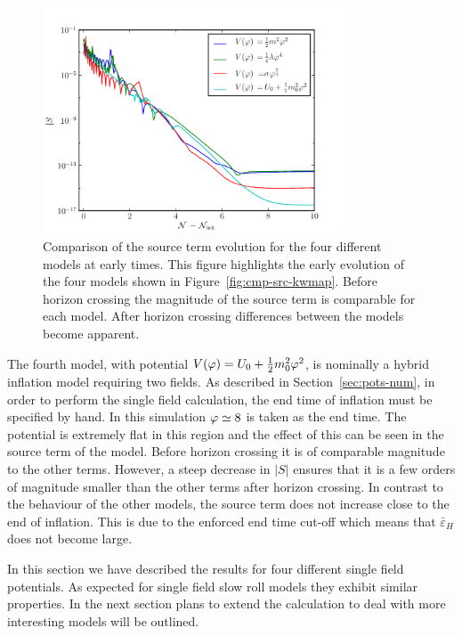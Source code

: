 \begin{figure}[htbp]
 \centering
 \includegraphics[width=0.8\textwidth]{numerical/graphs/cmp_src_kwmap_zoom-large}
 \caption[Comparison of Source Term at Early Times]{Comparison of the
source term evolution for the four different models at early times. This figure
highlights the early evolution of the four models shown in
Figure~\ref{fig:cmp-src-kwmap}. Before horizon crossing the magnitude of the source
term is comparable for each model. After horizon crossing differences between the
models become apparent.}
\label{fig:cmp-src-zoom-kwmap}
\end{figure}
% 

The fourth model, with potential $V(\varphi)=U_0 + \frac{1}{2} m_0^2 \varphi^2$, is nominally a hybrid
inflation model
requiring two fields.
As described in Section~\ref{sec:pots-num}, in order to perform the single field
calculation, the end time of inflation must be specified by hand. In this simulation
$\varphi\simeq 8$
is taken as the end time. The potential is extremely flat in this region and the
effect of this can
be seen in the source term of the model. Before horizon crossing it is of comparable magnitude to
the other terms. However, a steep decrease in $|S|$ ensures that it is a few orders
of magnitude
smaller than
the other terms after horizon crossing. In contrast to the behaviour of the other models, the source
term does not increase close to the end of inflation. This is due to the enforced end time cut-off
which means that $\bar{\varepsilon}_H$ does not become large.

In this section we have described the results for four different single field potentials. As
expected for single field slow roll models they exhibit similar properties. In the next section
plans to extend the calculation to deal with more interesting models will be outlined.

